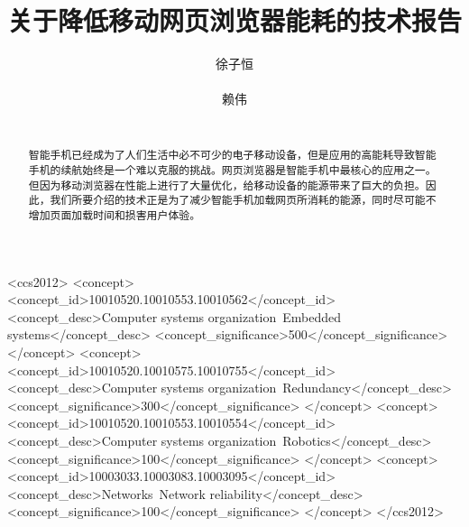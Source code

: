 \documentclass{sig-alternate-05-2015}
\begin{document}


\title{{\Huge 关于降低移动网页浏览器能耗的技术报告}}


\author{
\alignauthor
徐子恒\\
	   \\
\alignauthor
赖伟\\
       \\
}

\maketitle
\begin{abstract}
智能手机已经成为了人们生活中必不可少的电子移动设备，但是应用的高能耗导致智能手机的续航始终是一个难以克服的挑战。网页浏览器是智能手机中最核心的应用之一。但因为移动浏览器在性能上进行了大量优化，给移动设备的能源带来了巨大的负担。因此，我们所要介绍的技术正是为了减少智能手机加载网页所消耗的能源，同时尽可能不增加页面加载时间和损害用户体验。
\end{abstract}


%
%
\begin{CCSXML}
<ccs2012>
 <concept>
  <concept_id>10010520.10010553.10010562</concept_id>
  <concept_desc>Computer systems organization~Embedded systems</concept_desc>
  <concept_significance>500</concept_significance>
 </concept>
 <concept>
  <concept_id>10010520.10010575.10010755</concept_id>
  <concept_desc>Computer systems organization~Redundancy</concept_desc>
  <concept_significance>300</concept_significance>
 </concept>
 <concept>
  <concept_id>10010520.10010553.10010554</concept_id>
  <concept_desc>Computer systems organization~Robotics</concept_desc>
  <concept_significance>100</concept_significance>
 </concept>
 <concept>
  <concept_id>10003033.10003083.10003095</concept_id>
  <concept_desc>Networks~Network reliability</concept_desc>
  <concept_significance>100</concept_significance>
 </concept>
</ccs2012>  
\end{CCSXML}

\end{document}

